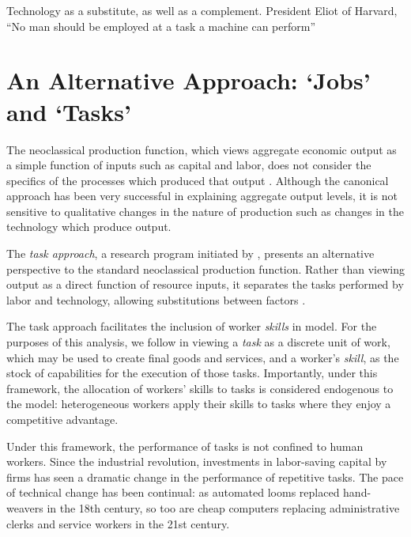 \documentclass[a4paper,11pt]{article}
\begin{document}
Technology as a substitute, as well as a complement. President Eliot of Harvard, ``No man should be employed at a task a machine can perform'' \cite{Nordhaus2007}

\section{An Alternative Approach: `Jobs' and `Tasks'}

The neoclassical production function, which views aggregate economic output as a simple function of inputs such as capital and labor, does not consider the specifics of the processes which produced that output \citep{Acemoglu2011}. Although the canonical approach has been very successful in explaining aggregate output levels, it is not sensitive to qualitative changes in the nature of production such as changes in the technology which produce output. 




The {\em task approach}, a research program initiated by \citet{Levy2003}, presents an alternative perspective to the standard neoclassical production function. Rather than viewing output as a direct function of resource inputs, it separates the tasks performed by labor and technology, allowing  substitutions between factors \citep{Autor2013,Acemoglu2011}. 

The task approach facilitates the inclusion of worker \emph{skills} in model. For the purposes of this analysis, we follow \citet{Autor2013} in viewing a \emph{task} as a discrete unit of work, which may be used to create final goods and services, and a worker's \emph{skill}, as the stock of capabilities for the execution of those tasks. Importantly, under this framework, the allocation of workers' skills to tasks is considered endogenous to the model: heterogeneous workers apply their skills to tasks where they enjoy a competitive advantage.

Under this framework, the performance of tasks is not confined to human workers. Since the industrial revolution, investments in labor-saving capital by firms has seen a dramatic change in the performance of repetitive tasks. The pace of technical change has been continual: as automated looms replaced hand-weavers in the 18th century, so too are cheap computers replacing administrative clerks and service workers in the 21st century.
\end{document}
